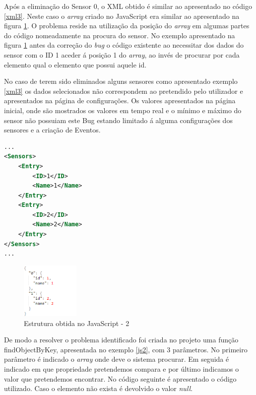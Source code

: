 \par Após a eliminação do Sensor 0, o XML obtido é similar ao apresentado no código \ref{xml3}. Neste caso o \textit{array} criado no JavaScript era similar ao apresentado na figura \ref{estruct2}. O problema reside na utilização da posição do \textit{array} em algumas partes do código nomeadamente na procura do sensor. No exemplo apresentado na figura \ref{estruct2} antes da correção do \textit{bug} o código existente ao necessitar dos dados do sensor com o ID 1 aceder á posição 1 do \textit{array}, ao invés de procurar por cada elemento qual o elemento que possui aquele id. 
\par No caso de terem sido eliminados alguns sensores como apresentado exemplo \ref{xml3} os dados selecionados não correspondem ao pretendido pelo utilizador e apresentados na página de configurações. Os valores apresentados na página inicial, onde são mostrados os valores em tempo real e o mínimo e máximo do sensor não possuiam este Bug estando limitado á alguma configurações dos sensores e a criação de Eventos.

\begin{lstlisting}[caption=Exemplo do XML após eliminação do Sensor,label={xml3},language=XML]
...
<Sensors>
    <Entry>
        <ID>1</ID>
        <Name>1</Name>
    </Entry>
    <Entry>
        <ID>2</ID>
        <Name>2</Name>
    </Entry>
</Sensors>
...
\end{lstlisting}

\begin{figure}[ht]
\centering
\includegraphics[width=0.25\textwidth]{images/estruct2.png}
\caption{Estrutura obtida no JavaScript - 2}\label{estruct2}
\end{figure}


\par De modo a resolver o problema identificado foi criada no projeto uma função findObjectByKey, apresentada no exemplo \ref{js2}, com 3 parâmetros. No primeiro parâmetro é indicado o \textit{array} onde deve o sistema procurar. Em seguida é indicado em que propriedade pretendemos compara e por último indicamos o valor que pretendemos encontrar. No código seguinte é apresentado o código utilizado. Caso o elemento não exista é devolvido o valor \textit{null}.

